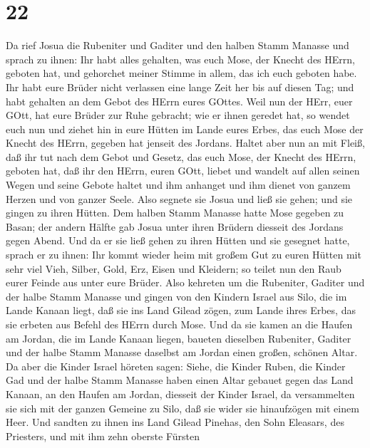\hypertarget{section-21}{%
\section{22}\label{section-21}}

 Da rief Josua die Rubeniter und Gaditer und den halben
Stamm Manasse  und sprach zu ihnen: Ihr habt alles gehalten,
was euch Mose, der Knecht des HErrn, geboten hat, und gehorchet meiner
Stimme in allem, das ich euch geboten habe.  Ihr habt eure
Brüder nicht verlassen eine lange Zeit her bis auf diesen Tag; und habt
gehalten an dem Gebot des HErrn eures GOttes.  Weil nun der
HErr, euer GOtt, hat eure Brüder zur Ruhe gebracht; wie er ihnen geredet
hat, so wendet euch nun und ziehet hin in eure Hütten im Lande eures
Erbes, das euch Mose der Knecht des HErrn, gegeben hat jenseit des
Jordans.  Haltet aber nun an mit Fleiß, daß ihr tut nach dem
Gebot und Gesetz, das euch Mose, der Knecht des HErrn, geboten hat, daß
ihr den HErrn, euren GOtt, liebet und wandelt auf allen seinen Wegen und
seine Gebote haltet und ihm anhanget und ihm dienet von ganzem Herzen
und von ganzer Seele.  Also segnete sie Josua und ließ sie
gehen; und sie gingen zu ihren Hütten.  Dem halben Stamm
Manasse hatte Mose gegeben zu Basan; der andern Hälfte gab Josua unter
ihren Brüdern diesseit des Jordans gegen Abend. Und da er sie ließ gehen
zu ihren Hütten und sie gesegnet hatte,  sprach er zu ihnen:
Ihr kommt wieder heim mit großem Gut zu euren Hütten mit sehr viel Vieh,
Silber, Gold, Erz, Eisen und Kleidern; so teilet nun den Raub eurer
Feinde aus unter eure Brüder.  Also kehreten um die
Rubeniter, Gaditer und der halbe Stamm Manasse und gingen von den
Kindern Israel aus Silo, die im Lande Kanaan liegt, daß sie ins Land
Gilead zögen, zum Lande ihres Erbes, das sie erbeten aus Befehl des
HErrn durch Mose.  Und da sie kamen an die Haufen am
Jordan, die im Lande Kanaan liegen, baueten dieselben Rubeniter, Gaditer
und der halbe Stamm Manasse daselbst am Jordan einen großen, schönen
Altar.  Da aber die Kinder Israel höreten sagen: Siehe, die
Kinder Ruben, die Kinder Gad und der halbe Stamm Manasse haben einen
Altar gebauet gegen das Land Kanaan, an den Haufen am Jordan, diesseit
der Kinder Israel,  da versammelten sie sich mit der ganzen
Gemeine zu Silo, daß sie wider sie hinaufzögen mit einem Heer.
 Und sandten zu ihnen ins Land Gilead Pinehas, den Sohn
Eleasars, des Priesters,  und mit ihm zehn oberste Fürsten
